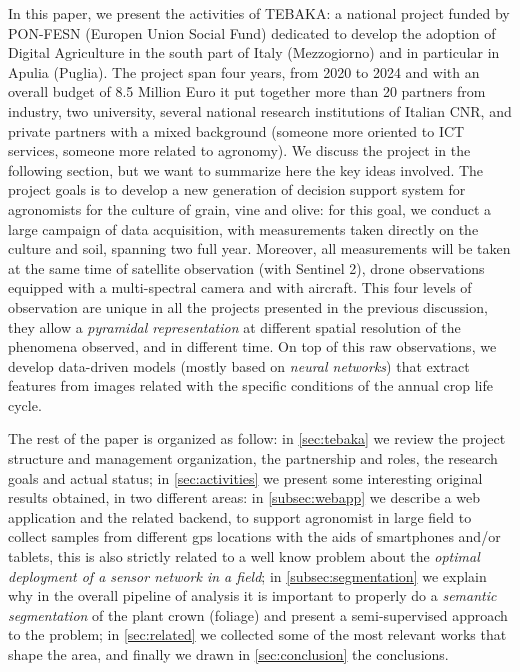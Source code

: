 \documentclass[comsoc,final]{IEEEtran}
\begin{document}
In this paper, we present the activities of \textsc{TEBAKA}: a national project funded by PON-FESN (Europen Union Social Fund) dedicated to develop the adoption of Digital Agriculture in the south part of Italy (Mezzogiorno) and in particular in Apulia (Puglia). The project span four years, from 2020 to 2024 and with an overall budget of 8.5 Million Euro it put together more than 20 partners from industry, two university, several national research institutions of Italian CNR, and private partners with a mixed background (someone more oriented to ICT services, someone more related to agronomy). 
We discuss the project in the following section, but we want to summarize here the key ideas involved. The project goals is to develop a new generation of decision support system for agronomists for the culture of grain, vine and olive: for this goal, we conduct a large campaign of data acquisition, with measurements taken directly on the culture and soil, spanning two full year. Moreover, all measurements will be taken at the same time of satellite observation (with Sentinel 2), drone observations equipped with a multi-spectral camera and with aircraft. This four levels of observation are unique in all the projects presented in the previous discussion, they allow a \emph{pyramidal representation} at different spatial resolution of the phenomena observed, and in different time. On top of this raw observations, we develop data-driven models (mostly based on \emph{neural networks}) that extract features from images related with the specific conditions of the annual crop life cycle.

The rest of the paper is organized as follow: in \ref{sec:tebaka} we review the project structure and management organization, the partnership and roles, the research goals and actual status; in \ref{sec:activities} we present some interesting original results obtained, in two different areas: in \ref{subsec:webapp} we describe a web application and the related backend, to support agronomist in large field to collect samples from different gps locations with the aids of smartphones and/or tablets, this is also strictly related to a well know problem about the \emph{optimal deployment of a sensor network in a field}; in \ref{subsec:segmentation} we explain why in the overall pipeline of analysis it is important to properly do a \emph{semantic segmentation} of the plant crown (foliage) and present a semi-supervised approach to the problem; in \ref{sec:related} we collected some of the most relevant works that shape the area, and finally we drawn in \ref{sec:conclusion} the conclusions.
\end{document}
